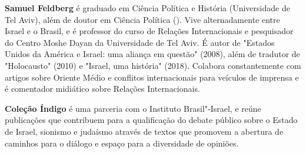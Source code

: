 \textbf{Samuel Feldberg} é graduado em Ciência Política e História (Universidade de Tel Aviv), além de doutor em Ciência Política (). Vive alternadamente entre Israel e o Brasil, e é professor do curso de Relações Internacionais e pesquisador do Centro Moshe Dayan da Universidade de Tel Aviv. É autor de "Estados Unidos da América e Israel: uma aliança em questão" (2008), além de tradutor de "Holocausto" (2010) e "Israel, uma história" (2018). Colabora constantemente com artigos sobre Oriente Médio e conflitos internacionais para veículos de imprensa e é comentador midiático sobre Relações Internacionais.

\textbf{Coleção Índigo} é uma parceria com o Instituto Brasil"-Israel, e reúne publicações que contribuem para a qualificação do debate público sobre o Estado de Israel, sionismo e judaísmo através de textos que promovem a abertura de caminhos para o diálogo e espaço para a diversidade de opiniões.


